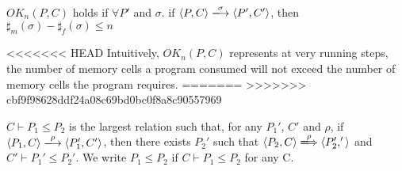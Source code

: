 \begin{myDef}
\label{df:okn}
\(OK_{n}(P, C)\) holds if \( \forall P'\) and \(\sigma\). if \( \langle P, C \rangle
\xlongrightarrow{\sigma} \langle P', C' \rangle \), then \( \sharp_m(\sigma) - \sharp_f(\sigma) \le n\)
\end{myDef}


<<<<<<< HEAD
Intuitively, \(OK_n(P, C)\) represents at very running steps, the
number of memory cells a program consumed will not exceed the number
of memory cells the program requires.
=======
>>>>>>> cbf9f98628ddf24a08c69bd0bc0f8a8c90557969

\begin{myDef}[Subtyping]
\( C\vdash P_1 \le P_2\) is the largest relation such that, for any
\(P_1'\), \(C'\) and \(\rho\), if \( \langle P_1, C \rangle
\xlongrightarrow{\rho} \langle P_1', C' \rangle \), then there exists
\(P_2'\) such that \( \langle P_2, C \rangle \xLongrightarrow{\rho}
\langle P_2', ' \rangle \) and \( C'\vdash P_1' \le P_2'\).  We write
\( P_1 \le P_2\) if \(C\vdash P_1 \le P_2\) for any C.
\label{df:subtype}
\end{myDef}

